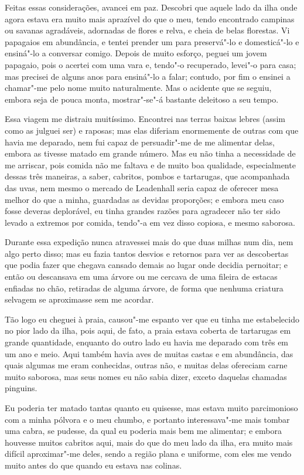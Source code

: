 Feitas essas considerações, avancei em paz. Descobri que aquele lado da
ilha onde agora estava era muito mais aprazível do que o meu, tendo
encontrado campinas ou savanas agradáveis, adornadas de flores e relva,
e cheia de belas florestas. Vi papagaios em abundância, e tentei prender
um para preservá"-lo e domesticá"-lo e ensiná"-lo a conversar comigo.
Depois de muito esforço, peguei um jovem papagaio, pois o acertei com
uma vara e, tendo"-o recuperado, levei"-o para casa; mas precisei de
alguns anos para ensiná"-lo a falar; contudo, por fim o ensinei a
chamar"-me pelo nome muito naturalmente. Mas o acidente que se seguiu,
embora seja de pouca monta, mostrar"-se"-á bastante deleitoso a seu tempo.

Essa viagem me distraiu muitíssimo. Encontrei nas terras baixas lebres
(assim como as julguei ser) e raposas; mas elas diferiam enormemente de
outras com que havia me deparado, nem fui capaz de persuadir"-me de me
alimentar delas, embora as tivesse matado em grande número. Mas eu não
tinha a necessidade de me arriscar, pois comida não me faltava e de
muito boa qualidade, especialmente dessas três maneiras, a saber,
cabritos, pombos e tartarugas, que acompanhada das uvas, nem mesmo o
mercado de Leadenhall seria capaz de oferecer mesa melhor do que a
minha, guardadas as devidas proporções; e embora meu caso fosse deveras
deplorável, eu tinha grandes razões para agradecer não ter sido levado a
extremos por comida, tendo"-a em vez disso copiosa, e mesmo saborosa.

Durante essa expedição nunca atravessei mais do que duas milhas num dia,
nem algo perto disso; mas eu fazia tantos desvios e retornos para ver as
descobertas que podia fazer que chegava cansado demais ao lugar onde
decidia pernoitar; e então ou descansava em uma árvore ou me cercava de
uma fileira de estacas enfiadas no chão, retiradas de alguma árvore, de
forma que nenhuma criatura selvagem se aproximasse sem me acordar.

Tão logo eu cheguei à praia, causou"-me espanto ver que eu tinha me
estabelecido no pior lado da ilha, pois aqui, de fato, a praia estava
coberta de tartarugas em grande quantidade, enquanto do outro lado eu
havia me deparado com três em um ano e meio. Aqui também havia aves de
muitas castas e em abundância, das quais algumas me eram conhecidas,
outras não, e muitas delas ofereciam carne muito saborosa, mas seus
nomes eu não sabia dizer, exceto daquelas chamadas pinguins.

Eu poderia ter matado tantas quanto eu quisesse, mas estava muito
parcimonioso com a minha pólvora e o meu chumbo, e portanto
interessava"-me mais tombar uma cabra, se pudesse, da qual eu poderia
mais bem me alimentar; e embora houvesse muitos cabritos aqui, mais do
que do meu lado da ilha, era muito mais difícil aproximar"-me deles,
sendo a região plana e uniforme, com eles me vendo muito antes do que
quando eu estava nas colinas.

